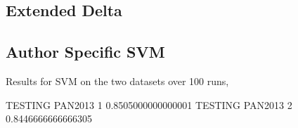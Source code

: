 \subsection{Extended Delta}

\subsection{Author Specific SVM}

Results for SVM on the two datasets over 100 runs,

TESTING PAN2013 1
0.8505000000000001
TESTING PAN2013 2
0.8446666666666305

